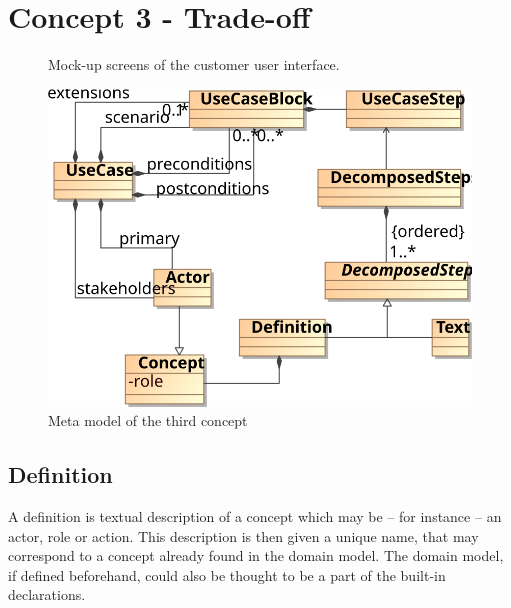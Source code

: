 \section{Concept 3 - Trade-off}
\begin{figure}[!htbp]
  \centering
    
  \caption{Mock-up screens of the customer user interface.}
\end{figure}
\begin{figure}[!htbp]
\includegraphics[scale=0.9]{img/3rd_iteration_meta_model}
\centering
\caption{Meta model of the third concept}
\label{fig:3rd_iteration_meta_model}
\end{figure}

\subsection{Definition}
A definition is textual description of a concept which may be -- for instance -- an actor, role or action. This description is then given a unique name, that may correspond to a concept already found in the domain model. The domain model, if defined beforehand, could also be thought to be a part of the built-in declarations.
